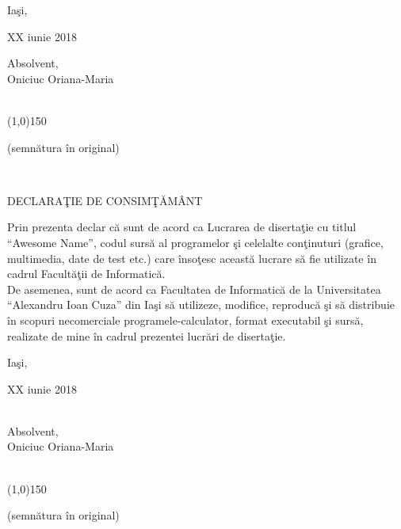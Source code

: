 \documentclass[11pt]{report}
\theoremstyle{plain}
\theoremstyle{definition}
\theoremstyle{definition}
\theoremstyle{proposition}
\begin{document}
\vspace{10mm}

Iaşi,
\

XX iunie 2018
\

\begin{flushright}
Absolvent,
\\

Oniciuc Oriana-Maria
\\
\
\

\line(1,0){150}
\

(semnătura în original)
\end{flushright}

\newpage

\

\vspace{20mm}
\begin{large}
\begin{center}
DECLARAŢIE DE CONSIMŢĂMÂNT
\end{center}
\end{large}

\vspace{30mm}

Prin prezenta declar că sunt de acord ca Lucrarea de disertaţie cu titlul ``Awesome Name”, codul sursă al programelor şi celelalte conţinuturi (grafice, multimedia, date de test etc.) care însoţesc această lucrare să fie utilizate în cadrul Facultăţii de Informatică.
\\

De asemenea, sunt de acord ca Facultatea de Informatică de la Universitatea ``Alexandru Ioan Cuza” din Iaşi să utilizeze, modifice, reproducă şi să distribuie în scopuri necomerciale programele-calculator, format executabil şi sursă, realizate de mine în cadrul prezentei lucrări de disertaţie.

\vspace{20mm}

Iaşi,
\

XX iunie 2018
\\
\

\begin{flushright}
Absolvent,
\\

Oniciuc Oriana-Maria
\\
\
\

\line(1,0){150}
\

(semnătura în original)
\end{flushright}

\newpage
\end{document}
